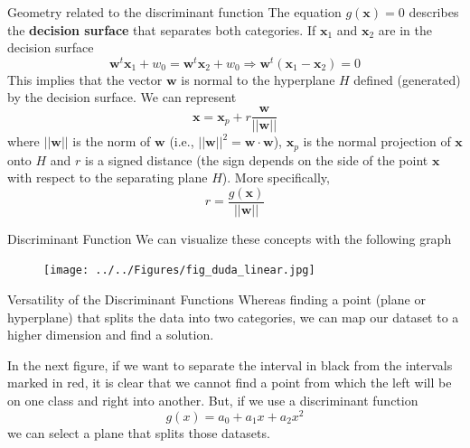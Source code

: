 \documentclass{beamer}
\begin{document}
\begin{frame}{Geometry related to the discriminant function}
	The equation $g(\mathbf{x})=0$ describes the {\bf decision surface} that separates both categories. If $\mathbf{x}_1$ and $\mathbf{x}_2$ are in the decision surface
	\begin{equation*}
		\mathbf{w}^t \mathbf{x}_1+w_0= \mathbf{w}^t \mathbf{x}_2+ w_0 \Rightarrow \mathbf{w}^t (\mathbf{x}_1 - \mathbf{x}_2)=0
	\end{equation*}
This implies that the vector $\mathbf{w}$ is normal to the hyperplane $H$ defined (generated) by the decision surface.
We can represent 
\begin{equation*}
	\mathbf{x}= \mathbf{x}_p+ r \frac{\mathbf{w}}{||\mathbf{w}||}
\end{equation*}
where $||\mathbf{w}||$ is the norm of $\mathbf{w}$ (i.e., $||\mathbf{w}||^2=\mathbf{w} \cdot \mathbf{w}$), $\mathbf{x}_p$ is the normal projection of $\mathbf{x}$ onto $H$ and $r$ is a signed distance (the sign depends on the side of the point $\mathbf{x}$ with respect to the separating plane $H$). More specifically,
\begin{equation*}
	r= \frac{g(\mathbf{x})}{||\mathbf{w}||}
\end{equation*}
\end{frame}

\begin{frame}{Discriminant Function }
	We can visualize these concepts with the following graph
\begin{figure}
	\centering
	\texttt{[image: ../../Figures/fig\_duda\_linear.jpg]}
\end{figure}	
	
\end{frame}


\begin{frame}{Versatility of the Discriminant Functions}
	Whereas finding a point (plane or hyperplane) that splits the data into two categories, we can map our dataset to a higher dimension and find a solution.
	
	In the next figure, if we want to separate the interval in black from the intervals marked in red, it is clear that we cannot find a point from which the left will be on one class and right into another. But, if we use a discriminant function
	\begin{equation*}
		g(x)= a_0+ a_1 x + a_2 x^2
	\end{equation*}
	we can select a plane that splits those datasets.
	
\end{frame}
\end{document}

